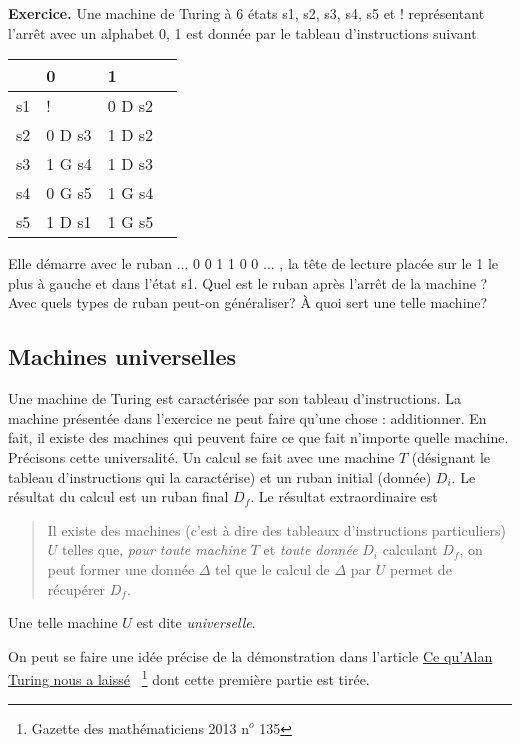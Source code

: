 \textbf{Exercice.}\newline
Une machine de Turing à 6 états s1, s2, s3, s4, s5 et ! représentant l'arrêt avec un alphabet 0, 1 est donnée par le tableau d'instructions suivant
\begin{center}
\renewcommand{\arraystretch}{1.5}
\begin{tabular}{|l|l|l|l|} \hline
   & 0  & 1     \\ \hline
s1 & !      & 0 D s2  \\ \hline
s2 & 0 D s3 & 1 D s2  \\ \hline
s3 & 1 G s4 & 1 D s3  \\ \hline
s4 & 0 G s5 & 1 G s4  \\ \hline
s5 & 1 D s1 & 1 G s5  \\ \hline
\end{tabular}
\end{center}
Elle démarre avec le ruban ... 0 0 1 1 0 0 ... , la tête de lecture placée sur le 1 le plus à gauche et dans l'état s1. Quel est le ruban après l'arrêt de la machine ? Avec quels types de ruban peut-on généraliser? \`A quoi sert une telle machine?

\subsection{Machines universelles}
Une machine de Turing est caractérisée par son tableau d'instructions. La machine présentée dans l'exercice ne peut faire qu'une chose : additionner.\newline
En fait, il existe des machines qui peuvent faire ce que fait n'importe quelle machine. Précisons cette universalité.\newline
Un calcul se fait avec une machine $T$ (désignant le tableau d'instructions qui la caractérise) et un ruban initial (donnée) $D_i$. Le résultat du calcul est un ruban final $D_f$. Le résultat extraordinaire est 
\begin{quotation}
  Il existe des machines (c'est à dire des tableaux d'instructions particuliers) $U$ telles que, \emph{pour toute machine} $T$ et \emph{toute donnée} $D_i$ calculant $D_f$, on peut former une donnée $\Delta$ tel que le calcul de $\Delta$ par $U$ permet de récupérer $D_f$.
\end{quotation} 
Une telle machine $U$ est dite \emph{universelle}.

On peut se faire une idée précise de la démonstration dans l'article \og\href{http://smf4.emath.fr/Publications/Gazette/2013/135/smf_gazette_135_17-31.pdf}{Ce qu'Alan Turing nous a laissé}\fg~ \footnote{Gazette des mathématiciens 2013 n$^o$ 135} dont cette première partie est tirée.

